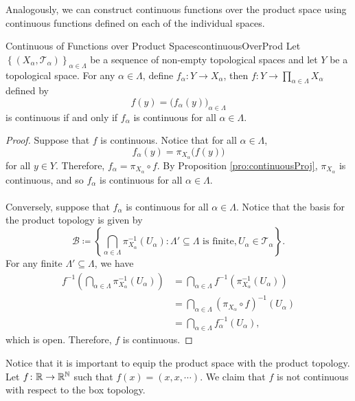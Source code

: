 \documentclass[math]{amznotes}
\theoremstyle{remark}
\begin{document}
Analogously, we can construct continuous functions over the product space using continuous functions defined on each of the individual spaces.
\begin{probox}{Continuous of Functions over Product Spaces}{continuousOverProd}
    Let $\left\{\left(X_{\alpha}, \mathcal{T}_{\alpha}\right)\right\}_{\alpha \in \Lambda}$ be a sequence of non-empty topological spaces and let $Y$ be a topological space. For any $\alpha \in \Lambda$, define $f_{\alpha} \colon Y \to X_{\alpha}$, then $f \colon Y \to \prod_{\alpha \in \Lambda}X_{\alpha}$ defined by 
    \begin{equation*}
        f\left(y\right) = \bigl(f_{\alpha}\left(y\right)\bigr)_{\alpha \in \Lambda}
    \end{equation*}
    is continuous if and only if $f_{\alpha}$ is continuous for all $\alpha \in \Lambda$.
    \tcblower
    \begin{proof}
        Suppose that $f$ is continuous. Notice that for all $\alpha \in \Lambda$,
        \begin{equation*}
            f_{\alpha}\left(y\right) = \pi_{X_{\alpha}}\bigl(f\left(y\right)\bigr)
        \end{equation*}
        for all $y \in Y$. Therefore, $f_{\alpha} = \pi_{X_{\alpha}} \circ f$. By Proposition \ref{pro:continuousProj}, $\pi_{X_{\alpha}}$ is continuous, and so $f_{\alpha}$ is continuous for all $\alpha \in \Lambda$.
        \\\\
        Conversely, suppose that $f_{\alpha}$ is continuous for all $\alpha \in \Lambda$. Notice that the basis for the product topology is given by 
        \begin{equation*}
            \mathcal{B} \coloneqq \left\{\bigcap_{\alpha \in \Lambda}\pi^{-1}_{X_{\alpha}}\left(U_{\alpha}\right) \colon \Lambda' \subseteq \Lambda \textrm{ is finite}, U_{\alpha} \in \mathcal{T}_{\alpha}\right\}.
        \end{equation*}
        For any finite $\Lambda' \subseteq \Lambda$, we have 
        \begin{align*}
            f^{-1}\left(\bigcap_{\alpha \in \Lambda}\pi^{-1}_{X_{\alpha}}\left(U_{\alpha}\right)\right) & = \bigcap_{\alpha \in \Lambda}f^{-1}\left(\pi^{-1}_{X_{\alpha}}\left(U_{\alpha}\right)\right) \\
            & = \bigcap_{\alpha \in \Lambda}\left(\pi_{X_{\alpha}} \circ f\right)^{-1}\left(U_{\alpha}\right) \\
            & =  \bigcap_{\alpha \in \Lambda}f_{\alpha}^{-1}\left(U_{\alpha}\right),
        \end{align*}
        which is open. Therefore, $f$ is continuous.
    \end{proof}
\end{probox}
Notice that it is important to equip the product space with the product topology. Let $f \colon \mathbb{R} \to \mathbb{R}^{\mathbb{N}}$ such that $f\left(x\right) = \left(x, x, \cdots\right)$. We claim that $f$ is not continuous with respect to the box topology.
\end{document}
